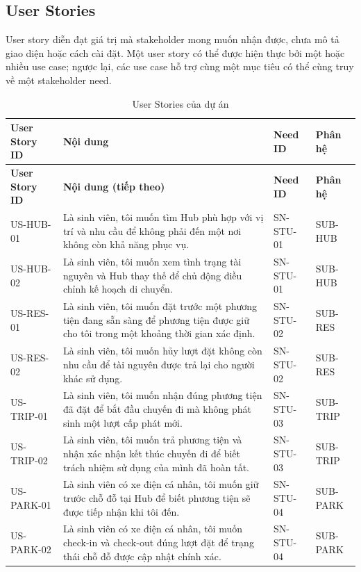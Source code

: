 \subsection{User Stories}

User story diễn đạt giá trị mà stakeholder mong muốn nhận được, chưa mô tả giao diện hoặc cách cài đặt. Một user story có thể được hiện thực bởi một hoặc nhiều use case; ngược lại, các use case hỗ trợ cùng một mục tiêu có thể cùng truy về một stakeholder need.

\begingroup
\small
\begin{longtable}{|L{22mm}|L{72mm}|L{23mm}|L{20mm}|}
  \caption{User Stories của dự án}\label{tab:user-stories}\\
  \hline
  \textbf{User Story ID} & \centering\arraybackslash\textbf{Nội dung} & \textbf{Need ID} & \textbf{Phân hệ}\\
  \hline
  \endfirsthead
  \hline
  \textbf{User Story ID} & \centering\arraybackslash\textbf{Nội dung (tiếp theo)} & \textbf{Need ID} & \textbf{Phân hệ}\\
  \hline
  \endhead
  US-HUB-01 & Là sinh viên, tôi muốn tìm Hub phù hợp với vị trí và nhu cầu để không phải đến một nơi không còn khả năng phục vụ. & SN-STU-01 & SUB-HUB\\
  \hline
  US-HUB-02 & Là sinh viên, tôi muốn xem tình trạng tài nguyên và Hub thay thế để chủ động điều chỉnh kế hoạch di chuyển. & SN-STU-01 & SUB-HUB\\
  \hline
  US-RES-01 & Là sinh viên, tôi muốn đặt trước một phương tiện đang sẵn sàng để phương tiện được giữ cho tôi trong một khoảng thời gian xác định. & SN-STU-02 & SUB-RES\\
  \hline
  US-RES-02 & Là sinh viên, tôi muốn hủy lượt đặt không còn nhu cầu để tài nguyên được trả lại cho người khác sử dụng. & SN-STU-02 & SUB-RES\\
  \hline
  US-TRIP-01 & Là sinh viên, tôi muốn nhận đúng phương tiện đã đặt để bắt đầu chuyến đi mà không phát sinh một lượt cấp phát mới. & SN-STU-03 & SUB-TRIP\\
  \hline
  US-TRIP-02 & Là sinh viên, tôi muốn trả phương tiện và nhận xác nhận kết thúc chuyến đi để biết trách nhiệm sử dụng của mình đã hoàn tất. & SN-STU-03 & SUB-TRIP\\
  \hline
  US-PARK-01 & Là sinh viên có xe điện cá nhân, tôi muốn giữ trước chỗ đỗ tại Hub để biết phương tiện sẽ được tiếp nhận khi tôi đến. & SN-STU-04 & SUB-PARK\\
  \hline
  US-PARK-02 & Là sinh viên có xe điện cá nhân, tôi muốn check-in và check-out đúng lượt đặt để trạng thái chỗ đỗ được cập nhật chính xác. & SN-STU-04 & SUB-PARK\\

\end{longtable}
